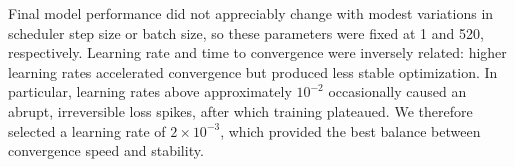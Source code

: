 \documentclass[preprint,review,12pt,numafflabel]{elsarticle}
\begin{document}

Final model performance did not appreciably change with modest variations in scheduler step size or batch size, so these parameters were fixed at 1 and 520, respectively. Learning rate and time to convergence were inversely related: higher learning rates accelerated convergence but produced less stable optimization. In particular, learning rates above approximately $10^{-2}$ occasionally caused an abrupt, irreversible loss spikes, after which training plateaued. We therefore selected a learning rate of $2\times10^{-3}$, which provided the best balance between convergence speed and stability.
\end{document}
